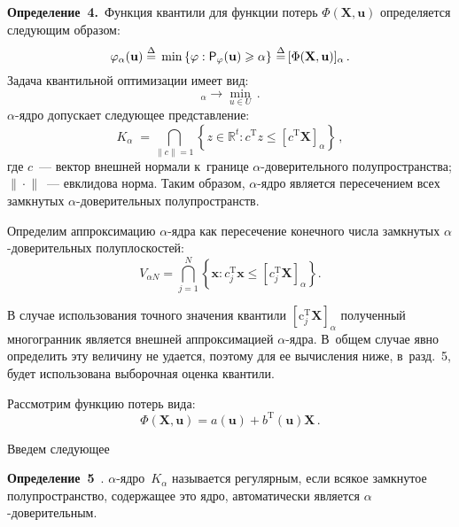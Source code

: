 \begin{multicols}{2}
\noindent
\textbf{Определение~4.}\
{Функция квантили для функции потерь $\Phi(\mathbf X,\mathbf u)$ 
определяется следующим образом:}
\begin{equation*}
\varphi_\alpha (\mathbf u)\;{\stackrel{\Delta}{=}}\;\min 
\left\{\varphi: {\sf P}_\varphi (\mathbf u)\geqslant \alpha \right\} 
\,{\stackrel{\Delta}{=}}\,[\Phi(\mathbf X,\mathbf u)]_\alpha\,.
\end{equation*}
Задача квантильной оптимизации имеет вид:
\begin{equation}
[\Phi(\mathbf X,\mathbf u)]_\alpha\to \min\limits_{u\in U}\,.
\label{e4-vas}
\end{equation}
$\alpha$-ядро допускает следующее представление:
\begin{equation*}
K_\alpha \; = \bigcap\limits_{\| c\|=1}
\left \{z\in \mathbb R^t:c^\mathrm{T} z\leqslant 
\left[c^\mathrm{T} \mathbf X\right]_\alpha\right\}\,,
\end{equation*}
 где $c$~--- вектор внешней нормали к~границе $\alpha$-до\-ве\-ри\-тель\-но\-го 
 полупространства; $\parallel \!\!\cdot\!\! \parallel$~--- евклидова норма.
Таким образом, $\alpha$-яд\-ро является пересечением всех замк\-ну\-тых 
$\alpha$-до\-ве\-ри\-тель\-ных полупространств.

Определим аппроксимацию $\alpha$-яд\-ра как пересечение конечного числа 
замкнутых $\alpha$-до\-ве\-ри\-тель\-ных полуплоскостей:
\begin{equation}
V_{\alpha N}=\bigcap\limits_{j=1}^{N} \left\{ 
\mathbf x: c_j^\mathrm{T} \mathbf  x \leqslant  
\left [ c_j^\mathrm{T} \mathbf X \right ]_\alpha\right \}.
\label{e6-vas}
\end{equation}

В случае использования точ\-но\-го значения квантили $\left [ \mathrm c_j^\mathrm{T} 
\mathbf X \right ]_\alpha$ полученный многогранник является внеш\-ней 
аппроксимацией $\alpha$-яд\-ра. В~общем случае явно определить эту величину 
не удается, поэтому для ее вы\-чис\-ле\-ния ниже, в~разд.~5, будет использована 
выборочная оценка квантили.

Рассмотрим функцию потерь вида:
\begin{equation}
\Phi(\mathbf X, \mathbf u)=a(\mathbf u)+b^{\mathrm{T}}(\mathbf u) \mathbf X\,.
\label{e7-vas}
\end{equation}

Введем следующее

\smallskip

\noindent
\textbf{Определение~5}~\cite{kankibzun}. $\alpha$-яд\-ро~$K_\alpha$ 
называется регулярным, если всякое замк\-ну\-тое полупространство, содержащее 
это ядро, автоматически является  \mbox{$\alpha$-до}\-ве\-ри\-тель\-ным.


\end{multicols}

